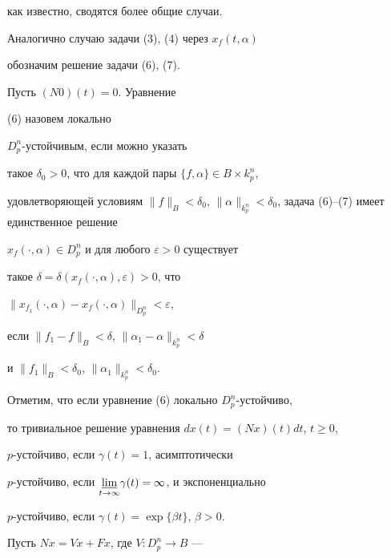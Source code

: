 как известно, сводятся более общие случаи.





Аналогично случаю задачи (3), (4) через $x_f(t,\alpha )$


обозначим решение задачи (6), (7).





\begin{defn}


Пусть $(N0)(t) = 0$. Уравнение


(6) назовем локально


$D_p^n$-устойчивым, если можно указать


такое $\delta _0 > 0$, что для каждой пары $\{f,\alpha \} \in B\times


k_p^n$,


удовлетворяющей условиям $\|f\|_B < \delta _0$, $\|\alpha \|_{k_p^n} <


\delta _0$, задача (6)--(7) имеет единственное решение


$x_f(\cdot,\alpha ) \in D_p^n$ и для любого $\varepsilon > 0$ существует


такое $\delta = \delta (x_f(\cdot,\alpha ),\varepsilon) > 0$, что


$\|x_{f_1}(\cdot,\alpha ) - x_f(\cdot,\alpha )\|_{D_p^n} < \varepsilon$,


если $\|f_1 - f\|_B < \delta$, $\|\alpha _1 - \alpha \|_{k_p^n} < \delta$


и $\|f_1\|_B < \delta _0$, $\|\alpha _1\|_{k_p^n} < \delta _0$.


\end{defn}





Отметим, что если уравнение (6) локально $D_p^n$-устойчиво,


то тривиальное решение уравнения $dx(t) = (Nx)(t)dt$, $t \ge 0$,


$p$-устойчиво, если $\gamma (t) = 1$, асимптотически


$p$-устойчиво, если $\underset{t\to\infty}{\varliminf}{}


\gamma (t) = \infty$, и экспоненциально


$p$-устойчиво, если $\gamma (t) = \exp \{\beta t\}$, $\beta > 0$.





Пусть $Nx = Vx + Fx$, где $V:D_p^n \to B$ ---


